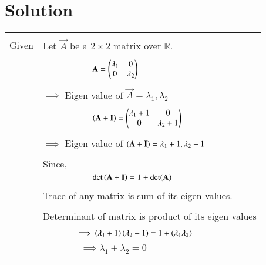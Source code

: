 \documentclass[journal,12pt]{IEEEtran}
\begin{document}
\section{\textbf{Solution}}
\renewcommand{\thetable}{1}
\begin{longtable}{|p{5cm}|p{13cm}|}
\hline
    \multirow{3}{*}{Given} 
    &\\
     & Let $\vec{A}$ be a $2\times2$ matrix over $\mathbb{R}$.\\
     &\\
    & $\qquad\qquad\qquad\mathbf{A}=\begin{pmatrix}\lambda_1&0\\0&\lambda_2\end{pmatrix}$\\
    &\\
    & $\implies$ Eigen value of $\vec{A}=\lambda_1,\lambda_2$\\
    &\\
    & $\qquad\qquad\qquad\left(\mathbf{A}+\mathbf{I}\right)=\begin{pmatrix}\lambda_1+1&0\\0&\lambda_2+1\end{pmatrix}$\\
    &\\
    & $\implies$ Eigen value of $\left(\mathbf{A}+\mathbf{I}\right) = \lambda_1+1,\lambda_2+1$\\
    &\\
    & Since,\\
    &$\qquad\qquad \qquad \det\left(\mathbf{A}+\mathbf{I}\right)=1+\det(\mathbf{A})$\\
    &\\
     & Trace of any matrix is sum of its eigen values. \\
    &\\
    & Determinant of matrix is product of its eigen values \\
    &\\
    & $\qquad\qquad\implies \left(\lambda_1+1\right)\left(\lambda_2+1\right)=1+\left(\lambda_1\lambda_2\right)$\\
    &\\
    &$\qquad\qquad\implies\boxed{ \lambda_1+\lambda_2 = 0}$\\
    &\\
   

\end{longtable}
\end{document}
